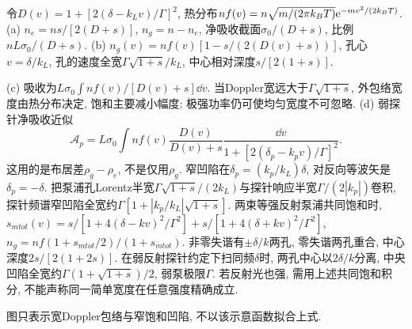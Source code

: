 \begin{solution}令$D(v)=1+[2(\delta-k_Lv)/\Gamma]^2$, 热分布$nf(v)=n\sqrt{m/(2\pi k_BT)}\mathrm e^{-mv^2/(2k_BT)}$. (a) $n_e=ns/[2(D+s)]$, $n_g=n-n_e$, 净吸收截面$\sigma_0/(D+s)$, 比例$nL\sigma_0/(D+s)$. (b) $n_g(v)=nf(v)[1-s/(2(D(v)+s))]$, 孔心$v=\delta/k_L$, 孔的速度全宽$\Gamma\sqrt{1+s}/k_L$, 中心相对深度$s/[2(1+s)]$.

(c) 吸收为$L\sigma_0\int nf(v)/[D(v)+s]\dd v$. 当Doppler宽远大于$\Gamma\sqrt{1+s}$, 外包络宽度由热分布决定, 饱和主要减小幅度; 极强功率仍可使均匀宽度不可忽略. (d) 弱探针净吸收近似
\[\mathcal A_p=L\sigma_0\int nf(v)\frac{D(v)}{D(v)+s}\frac{\dd v}{1+[2(\delta_p-k_pv)/\Gamma]^2}.\]
这用的是布居差$\rho_g-\rho_e$, 不是仅用$\rho_g$. 窄凹陷在$\delta_p=(k_p/k_L)\delta$, 对反向等波矢是$\delta_p=-\delta$. 把泵浦孔Lorentz半宽$\Gamma\sqrt{1+s}/(2k_L)$与探针响应半宽$\Gamma/(2|k_p|)$卷积, 探针频谱窄凹陷全宽约$\Gamma[1+|k_p/k_L|\sqrt{1+s}]$. 两束等强反射泵浦共同饱和时,$s_{
m tot}(v)=s/[1+4(\delta-kv)^2/\Gamma^2]+s/[1+4(\delta+kv)^2/\Gamma^2]$, $n_g=nf(1+s_{
m tot}/2)/(1+s_{
m tot})$. 非零失谐有$\pm\delta/k$两孔, 零失谐两孔重合, 中心深度$2s/[2(1+2s)]$. 在弱反射探针约定下扫同频$\delta$时, 两孔中心以$2\delta/k$分离, 中央凹陷全宽约$\Gamma(1+\sqrt{1+s})/2$, 弱泵极限$\Gamma$. 若反射光也强, 需用上述共同饱和积分, 不能声称同一简单宽度在任意强度精确成立.
\begin{center}\end{center}
图只表示宽Doppler包络与窄饱和凹陷, 不以该示意函数拟合上式.
\end{solution}

